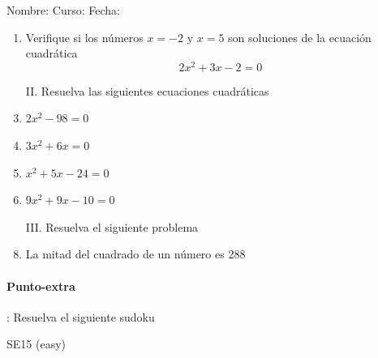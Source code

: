 \documentclass[fleqn]{article}
\newcommand{\LineaNombre}{%
\par
\vspace{\baselineskip}
Nombre:\hrulefill \; Curso: \underline{\hspace*{48pt}} \; Fecha: \underline{\hspace*{2.5cm}} \relax
\par}
\begin{document}
\LineaNombre
\begin{enumerate}
 \item Verifique si los números $x=-2$ \; y \; $x=5$ son soluciones de la ecuación cuadrática \[2x^{2}+3x-2=0\] \noanswer

\item[II.] Resuelva las siguientes ecuaciones cuadráticas
 \item $2x^{2}-98=0$\noanswer
 \item $3x^{2}+6x=0$\noanswer
 \newpage
 \item $x^{2}+5x-24=0$\noanswer
 \item $9x^{2}+9x-10=0$\noanswer
 \item[III.] Resuelva el siguiente problema
 \item La mitad del cuadrado de un número es 288\noanswer
 \end{enumerate}
 \begin{minipage}{.4\textwidth}
\paragraph*{Punto-extra}: Resuelva el siguiente sudoku 
 \end{minipage}
 \cluefont{\Large}
\begin{minipage}{.55\textwidth}
\begin{minipage}{0.45\linewidth}\begin{center}
SE15 (easy) \\
\end{center}\end{minipage}
\end{minipage}
\end{document}
